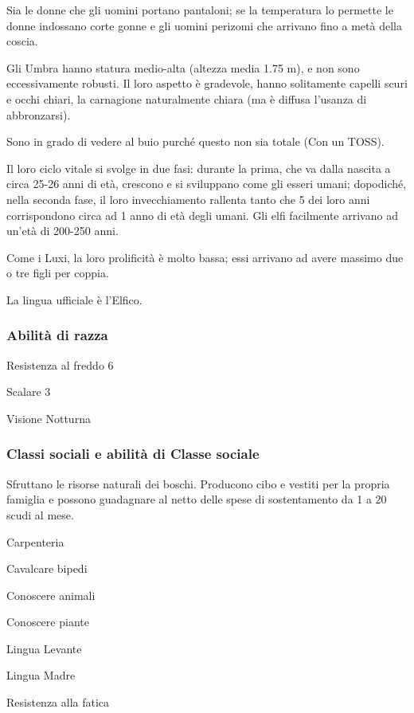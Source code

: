 Sia le donne che gli uomini portano pantaloni; se la temperatura lo
permette le donne indossano corte gonne e gli uomini perizomi che
arrivano fino a met\`a della coscia.


\Fisico Gli Umbra hanno statura medio-alta (altezza media 1.75 m), e
non sono eccessivamente robusti. Il loro aspetto \`e gradevole, hanno
solitamente capelli scuri e occhi chiari, la carnagione naturalmente
chiara (ma \`e diffusa l'usanza di abbronzarsi).

Sono in grado di vedere al buio purch\'e questo non sia totale (Con un
TOSS).

Il loro ciclo vitale si svolge in due fasi: durante la prima, che va
dalla nascita a circa 25-26 anni di et\`a, crescono e si sviluppano
come gli esseri umani; dopodich\'e, nella seconda fase, il loro
invecchiamento rallenta tanto che 5 dei loro anni corrispondono circa
ad 1 anno di et\`a degli umani. Gli elfi facilmente arrivano ad
un'et\`a di 200-250 anni.

Come i Luxi, la loro prolificit\`a \`e molto bassa; essi arrivano ad
avere massimo due o tre figli per coppia.

La lingua ufficiale \`e l'Elfico.

\minmaxelfi

\subsubsection{Abilit\`a di razza}
\begin{abilist}
\item Resistenza al freddo 6
\item Scalare 3
\item Visione Notturna
\end{abilist}

\subsubsection{Classi sociali e abilit\`a di Classe sociale}


Sfruttano le risorse naturali dei boschi. Producono cibo e vestiti per la
propria famiglia e possono guadagnare al netto delle spese di
sostentamento da 1 a 20 scudi al mese.

\begin{abilist}
\item Carpenteria
\item Cavalcare bipedi
\item Conoscere animali
\item Conoscere piante
\item Lingua Levante
\item Lingua Madre
\item Resistenza alla fatica
\end{abilist}


